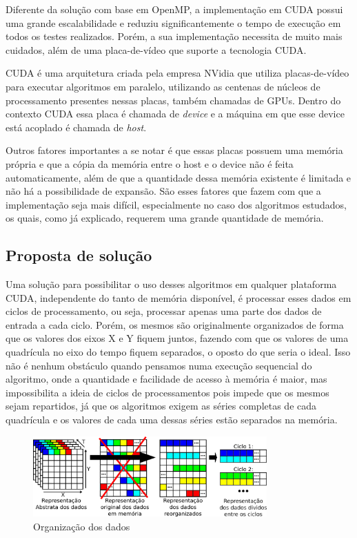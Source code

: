 Diferente da solução com base em OpenMP, a implementação em CUDA \cite{cuda_guide} possui uma grande escalabilidade e reduziu significantemente o tempo de execução em todos os testes realizados. Porém, a sua implementação necessita de muito mais cuidados, além de uma placa-de-vídeo que suporte a tecnologia CUDA.

CUDA é uma arquitetura criada pela empresa NVidia que utiliza placas-de-vídeo para executar algoritmos em paralelo, utilizando as centenas de núcleos de processamento presentes nessas placas, também chamadas de GPUs. Dentro do contexto CUDA essa placa é chamada de \textit{device} e a máquina em que esse device está acoplado é chamada de \textit{host}.

Outros fatores importantes a se notar é que essas placas possuem uma memória própria e que a cópia da memória entre o host e o device não é feita automaticamente, além de que a quantidade dessa memória existente é limitada e não há a possibilidade de expansão. São esses fatores que fazem com que a implementação seja mais difícil, especialmente no caso dos algoritmos estudados, os quais, como já explicado, requerem uma grande quantidade de memória.

\subsection{Proposta de solução}\label{cap:proposta_solucao}

Uma solução para possibilitar o uso desses algoritmos em qualquer plataforma CUDA, independente do tanto de memória disponível, é processar esses dados em ciclos de processamento, ou seja, processar apenas uma parte dos dados de entrada a cada ciclo. Porém, os mesmos são originalmente organizados de forma que os valores dos eixos X e Y fiquem juntos, fazendo com que os valores de uma quadrícula no eixo do tempo fiquem separados, o oposto do que seria o ideal. Isso não é nenhum obstáculo quando pensamos numa execução sequencial do algoritmo, onde a quantidade e facilidade de acesso à memória é maior, mas impossibilita a ideia de ciclos de processamentos pois impede que os mesmos sejam repartidos, já que os algoritmos exigem as séries completas de cada quadrícula e os valores de cada uma dessas séries estão separados na memória.

\begin{figure}[H]
\centering
\includegraphics[width=0.8\textwidth]{Imagens/organizacao_dados/organizacao_dados.png}
\caption{Organização dos dados}
\label{fig:reorganizacao_dados}
\end{figure}

